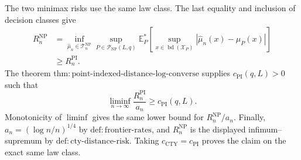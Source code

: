 The two minimax risks use the same law class.  The last equality and inclusion of decision classes give
\[
\begin{aligned}
 R_n^{\mathrm{NP}}
 &=\inf_{\widehat\mu_n\in\mathcal T_n^{\mathrm{NP}}}
   \sup_{P\in\mathcal P_{\mathrm{NP}}(L,q)}
   \mathbb E_P^*\!\left[
     \sup_{x\in\operatorname{bd}(\mathcal X_P)}
     |\widehat\mu_n(x)-\mu_P(x)|
   \right]\\
 &\geq R_n^{\mathrm{PI}}.
\end{aligned}
\]
The theorem \(\mathrm{thm:point\text{-}indexed\text{-}distance\text{-}log\text{-}converse}\) supplies \(c_{\mathrm{PI}}(q,L)>0\) such that
\[
 \liminf_{n\to\infty}\frac{R_n^{\mathrm{PI}}}{a_n}
 \geq c_{\mathrm{PI}}(q,L).
\]
Monotonicity of \(\liminf\) gives the same lower bound for \(R_n^{\mathrm{NP}}/a_n\).  Finally, \(a_n=(\log n/n)^{1/4}\) by \(\mathrm{def:frontier\text{-}rates}\), and \(R_n^{\mathrm{NP}}\) is the displayed infimum--supremum by \(\mathrm{def:cty\text{-}distance\text{-}risk}\).  Taking \(c_{\mathrm{CTY}}=c_{\mathrm{PI}}\) proves the claim on the exact same law class.